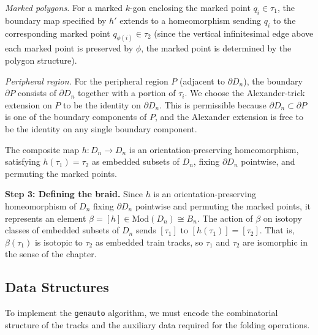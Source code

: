 \begin{myproof}
    \emph{Marked polygons.} For a marked $k$-gon enclosing the marked point $q_i \in \tau_1$, the boundary map specified by $h'$ extends to a homeomorphism sending $q_i$ to the corresponding marked point $q_{\phi(i)} \in \tau_2$ (since the vertical infinitesimal edge above each marked point is preserved by $\phi$, the marked point is determined by the polygon structure).

    \emph{Peripheral region.} For the peripheral region $P$ (adjacent to $\partial D_n$), the boundary $\partial P$ consists of $\partial D_n$ together with a portion of $\tau_i$. We choose the Alexander-trick extension on $P$ to be the identity on $\partial D_n$. This is permissible because $\partial D_n \subset \partial P$ is one of the boundary components of $P$, and the Alexander extension is free to be the identity on any single boundary component.

    The composite map $h: D_n \to D_n$ is an orientation-preserving homeomorphism, satisfying $h(\tau_1) = \tau_2$ as embedded subsets of $D_n$, fixing $\partial D_n$ pointwise, and permuting the marked points.

    \textbf{Step 3: Defining the braid.}
    Since $h$ is an orientation-preserving homeomorphism of $D_n$ fixing $\partial D_n$ pointwise and permuting the marked points, it represents an element $\beta = [h] \in \mathrm{Mod}(D_n) \cong B_n$. The action of $\beta$ on isotopy classes of embedded subsets of $D_n$ sends $[\tau_1]$ to $[h(\tau_1)] = [\tau_2]$. That is, $\beta(\tau_1)$ is isotopic to $\tau_2$ as embedded train tracks, so $\tau_1$ and $\tau_2$ are isomorphic in the sense of the chapter.
\end{myproof}

\subsection{Data Structures}
\label{subsec:data_structures}

To implement the \texttt{genauto} algorithm, we must encode the combinatorial structure of the tracks and the auxiliary data required for the folding operations.

